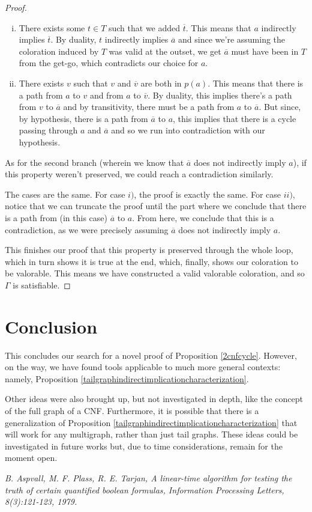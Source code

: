 \documentclass[11pt]{article}
\newcommand{\conj}[1]{\overline{#1}}
\begin{document}
\begin{proof}
\begin{enumerate}[i)]
\item There exists some $t \in T$ such that we added $\conj t$. This means that $a$ indirectly implies $\conj t$. By duality, $t$ indirectly implies $\conj a$ and since we're assuming the coloration induced by $T$ was valid at the outset, we get $\conj a$ must have been in $T$ from the get-go, which contradicts our choice for $a$.

\item There exists $v$ such that $v$ and $\conj v$ are both in $p(a)$. This means that there is a path from $a$ to $v$ and from $a$ to $\conj v$. By duality, this implies there's a path from $v$ to $\conj a$ and by transitivity, there must be a path from $a$ to $\conj a$. But since, by hypothesis, there is a path from $\conj a$ to $a$, this implies that there is a cycle passing through $a$ and $\conj a$ and so we run into contradiction with our hypothesis.
\end{enumerate}

As for the second branch (wherein we know that $\conj a$ does not indirectly imply $a$), if this property weren't preserved, we could reach a contradiction similarly.

The cases are the same. For case $i)$, the proof is exactly the same. For case $ii)$, notice that we can truncate the proof until the part where we conclude that there is a path from (in this case) $\conj a$ to $a$. From here, we conclude that this is a contradiction, as we were precisely assuming $\conj a$ does not indirectly imply $a$.

This finishes our proof that this property is preserved through the whole loop, which in turn shows it is true at the end, which, finally, shows our coloration to be valorable. This means we have constructed a valid valorable coloration, and so $\Gamma$ is satisfiable.
\end{proof}

\section{Conclusion}

This concludes our search for a novel proof of Proposition \ref{2cnfcycle}. However, on the way, we have found tools applicable to much more general contexts: namely, Proposition \ref{tailgraphindirectimplicationcharacterization}.

Other ideas were also brought up, but not investigated in depth, like the concept of the full graph of a CNF. Furthermore, it is possible that there is a generalization of Proposition  \ref{tailgraphindirectimplicationcharacterization} that will work for any multigraph, rather than just tail graphs. These ideas could be investigated in future works but, due to time considerations, remain for the moment open.


\begin{thebibliography}{1}

\textit{B. Aspvall, M. F. Plass, R. E. Tarjan, A linear-time algorithm for testing the truth of certain quantified boolean formulas, Information Processing Letters, 8(3):121-123, 1979.}

\end{thebibliography}
\end{document}
